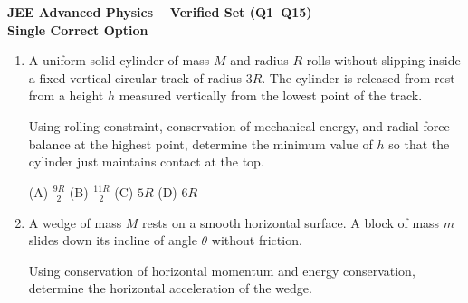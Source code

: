 \documentclass[12pt]{article}
\begin{document}
{\Large \textbf{JEE Advanced Physics – Verified Set (Q1–Q15)}}\\[4pt]
\textbf{Single Correct Option}

\vspace{0.4cm}

\begin{enumerate}[label=\arabic*., leftmargin=0pt, itemindent=18pt, itemsep=1em]

\item A uniform solid cylinder of mass $M$ and radius $R$ rolls without slipping inside a fixed vertical circular track of radius $3R$. The cylinder is released from rest from a height $h$ measured vertically from the lowest point of the track.

Using rolling constraint, conservation of mechanical energy, and radial force balance at the highest point, determine the minimum value of $h$ so that the cylinder just maintains contact at the top.

\begin{center}
\end{center}

(A) $\frac{9R}{2}$  
(B) $\frac{11R}{2}$  
(C) $5R$  
(D) $6R$

\item A wedge of mass $M$ rests on a smooth horizontal surface. A block of mass $m$ slides down its incline of angle $\theta$ without friction.

Using conservation of horizontal momentum and energy conservation, determine the horizontal acceleration of the wedge.

\begin{center}
\end{center}


\end{enumerate}
\end{document}
